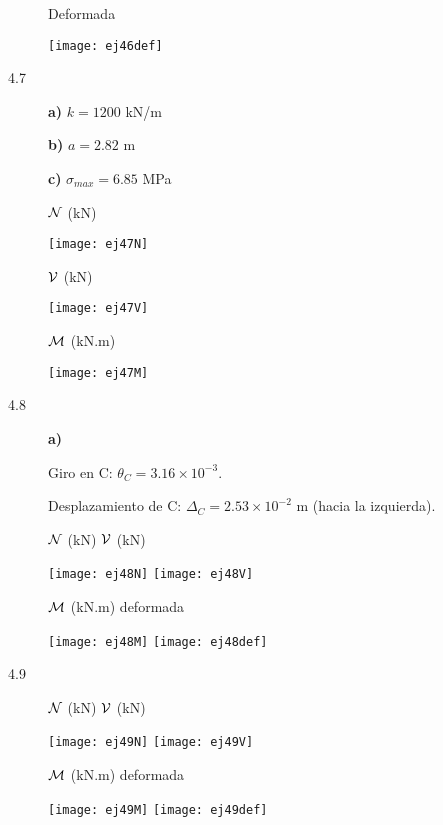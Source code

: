 \begin{description}
Deformada

\begin{center}
	\texttt{[image: ej46def]}
\end{center}


\item[4.7]

\textbf{a)} $k = 1200$ kN/m

\textbf{b)} $a = 2.82$ m

\textbf{c)} $\sigma_{max} = 6.85$  MPa

${\mathcal N}$ (kN)

\begin{center}
	\texttt{[image: ej47N]}
\end{center}

${\mathcal V}$ (kN)

\begin{center}
	\texttt{[image: ej47V]}
\end{center}

${\mathcal M}$ (kN.m)

\begin{center}
	\texttt{[image: ej47M]}
\end{center}

\item[4.8]
\textbf{a)}

Giro en C: $\theta_C = 3.16 \times 10^{-3}$.

Desplazamiento de C: $\Delta_C = 2.53 \times 10^{-2}$ m (hacia la izquierda).

${\mathcal N}$ (kN) \hspace{0.4\textwidth} ${\mathcal V}$ (kN)
\begin{center}
	\texttt{[image: ej48N]}
	\texttt{[image: ej48V]}
\end{center}

${\mathcal M}$ (kN.m) \hspace{0.4\textwidth} deformada
\begin{center}
	\texttt{[image: ej48M]}
	\texttt{[image: ej48def]}
\end{center}

\item [4.9]

${\mathcal N}$ (kN) \hspace{0.4\textwidth} ${\mathcal V}$ (kN)
\begin{center}
	\texttt{[image: ej49N]}
	\texttt{[image: ej49V]}
\end{center}

${\mathcal M}$ (kN.m) \hspace{0.4\textwidth} deformada
\begin{center}
	\texttt{[image: ej49M]}
	\texttt{[image: ej49def]}
\end{center}

\end{description}




